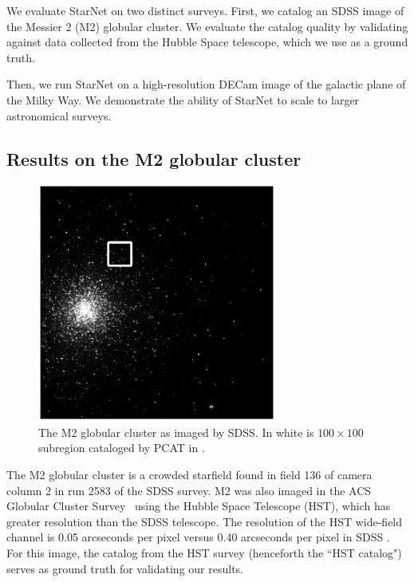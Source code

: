 We evaluate StarNet on two distinct surveys. First, we catalog an SDSS image of the Messier 2 (M2) globular cluster. 
We evaluate the catalog quality by validating against data collected from 
the Hubble Space telescope, which we use as a ground truth. 

Then, we run StarNet on a high-resolution DECam image of the galactic plane of the Milky Way. 
We demonstrate the ability of StarNet to scale to larger astronomical surveys.

\subsection{Results on the M2 globular cluster}
\label{sec:results_on_m2}

\begin{figure}[tb]
    \centering
    \includegraphics[width=0.7\textwidth]{figures_vg/m2_results/m2_regions.eps}
    \caption{The M2 globular cluster as imaged by SDSS. In white is $100 \times 100$ subregion 
    cataloged by PCAT in \cite{Feder_2019}. }
    \label{fig:m2_region}
\end{figure}

The M2 globular cluster is a crowded starfield found in field 136 of camera column 2 in run 2583 of the SDSS survey. 
M2 was also imaged in the ACS Globular Cluster Survey~\citep{Sarajedini_2007}
using the Hubble Space Telescope (HST),
which has greater resolution than the SDSS telescope.
The resolution of the HST wide-field channel is 0.05 arcseconds per pixel versus
0.40 arcseconds per pixel in SDSS \citep{hubble_about, sdss_about}.
For this image, the catalog from the HST survey (henceforth the ``HST catalog")
serves as ground truth for validating our results.

